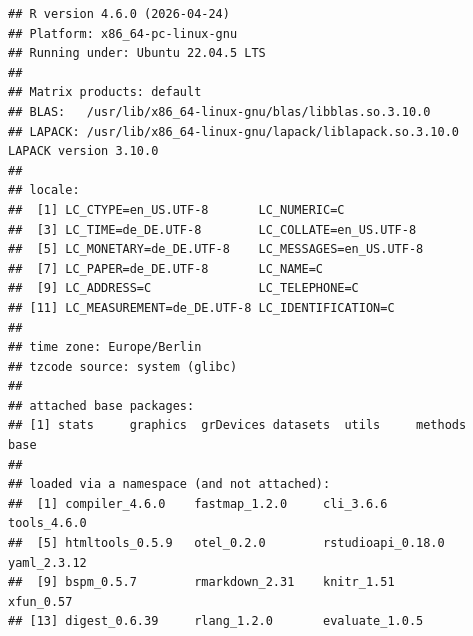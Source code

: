 \documentclass[
  a4paper,
]{article}
\begin{document}
\begin{verbatim}
## R version 4.6.0 (2026-04-24)
## Platform: x86_64-pc-linux-gnu
## Running under: Ubuntu 22.04.5 LTS
## 
## Matrix products: default
## BLAS:   /usr/lib/x86_64-linux-gnu/blas/libblas.so.3.10.0 
## LAPACK: /usr/lib/x86_64-linux-gnu/lapack/liblapack.so.3.10.0  LAPACK version 3.10.0
## 
## locale:
##  [1] LC_CTYPE=en_US.UTF-8       LC_NUMERIC=C              
##  [3] LC_TIME=de_DE.UTF-8        LC_COLLATE=en_US.UTF-8    
##  [5] LC_MONETARY=de_DE.UTF-8    LC_MESSAGES=en_US.UTF-8   
##  [7] LC_PAPER=de_DE.UTF-8       LC_NAME=C                 
##  [9] LC_ADDRESS=C               LC_TELEPHONE=C            
## [11] LC_MEASUREMENT=de_DE.UTF-8 LC_IDENTIFICATION=C       
## 
## time zone: Europe/Berlin
## tzcode source: system (glibc)
## 
## attached base packages:
## [1] stats     graphics  grDevices datasets  utils     methods   base     
## 
## loaded via a namespace (and not attached):
##  [1] compiler_4.6.0    fastmap_1.2.0     cli_3.6.6         tools_4.6.0      
##  [5] htmltools_0.5.9   otel_0.2.0        rstudioapi_0.18.0 yaml_2.3.12      
##  [9] bspm_0.5.7        rmarkdown_2.31    knitr_1.51        xfun_0.57        
## [13] digest_0.6.39     rlang_1.2.0       evaluate_1.0.5
\end{verbatim}
\end{document}
